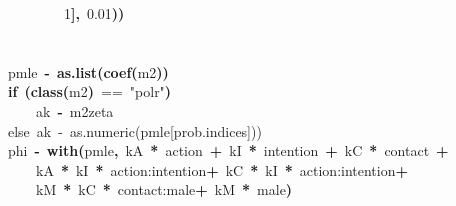 \documentclass{article}
\makeatletter
\newcommand{\hlnumber}[1]{\textcolor[rgb]{0,0,0}{#1}}%
\newcommand{\hlfunctioncall}[1]{\textcolor[rgb]{.5,0,.33}{\textbf{#1}}}%
\newcommand{\hlstring}[1]{\textcolor[rgb]{.6,.6,1}{#1}}%
\newcommand{\hlkeyword}[1]{\textbf{#1}}%
\newcommand{\hlcomment}[1]{\textcolor[rgb]{.18,.6,.34}{#1}}%
\newcommand{\hlassignement}[1]{\textbf{#1}}%
\newcommand{\hlsymbol}[1]{#1}%
\newcommand{\hlstd}[1]{\textcolor[rgb]{0,0,0}{#1}}%
\newenvironment{kframe}{%
 \def\FrameCommand##1{\hskip\@totalleftmargin \hskip-\fboxsep
 \colorbox{shadecolor}{##1}\hskip-\fboxsep
     \hskip-\linewidth \hskip-\@totalleftmargin \hskip\columnwidth}%
 \MakeFramed {\advance\hsize-\width
   \@totalleftmargin\z@ \linewidth\hsize
   \@setminipage}}%
 {\par\unskip\endMakeFramed}
\newenvironment{knitrout}{}{} %
\makeatother
\begin{document}
\begin{knitrout}
{\begin{kframe}
\begin{flushleft}
\hlstd{}{\ }{\ }{\ }{\ }{\ }{\ }{\ }{\ }{\ }{\ }{\ }{\ }\hlnumber{1}\hlkeyword{]}\hlkeyword{,}{\ }\hlnumber{0.01}\hlkeyword{)}\hlkeyword{)}\hspace*{\fill}\\
\hlstd{}{\ }{\ }{\ }{\ }\hlkeyword{\usebox{\hlnormalsizeboxclosebrace}}\hspace*{\fill}\\
\hlstd{}\hspace*{\fill}\\
\hlstd{}{\ }{\ }{\ }{\ }\hlsymbol{pmle}{\ }\hlassignement{\usebox{\hlnormalsizeboxlessthan}-}{\ }\hlfunctioncall{as.list}\hlkeyword{(}\hlfunctioncall{coef}\hlkeyword{(}\hlsymbol{m2}\hlkeyword{)}\hlkeyword{)}\hspace*{\fill}\\
\hlstd{}{\ }{\ }{\ }{\ }\hlkeyword{if}{\ }\hlkeyword{(}\hlfunctioncall{class}\hlkeyword{(}\hlsymbol{m2}\hlkeyword{)}{\ }=={\ }\hlstring{"{}polr"{}}\hlkeyword{)}\hspace*{\fill}\\
\hlstd{}{\ }{\ }{\ }{\ }{\ }{\ }{\ }{\ }\hlsymbol{ak}{\ }\hlassignement{\usebox{\hlnormalsizeboxlessthan}-}{\ }\hlsymbol{m2}\hlkeyword{\usebox{\hlnormalsizeboxdollar}}\hlsymbol{zeta}\hspace*{\fill}\\
\hlstd{}{\ }{\ }{\ }{\ }\hlcomment{\usebox{\hlnormalsizeboxhash}else{\ }ak{\ }\usebox{\hlnormalsizeboxlessthan}-{\ }as.numeric(pmle[prob.indices]))}\hspace*{\fill}\\
\hlstd{}{\ }{\ }{\ }{\ }\hlsymbol{phi}\hlsymbol{}{\ }\hlassignement{\usebox{\hlnormalsizeboxlessthan}-}{\ }\hlfunctioncall{with}\hlkeyword{(}\hlsymbol{pmle}\hlkeyword{,}{\ }\hlsymbol{kA}{\ }\hlkeyword{*}{\ }\hlsymbol{action}{\ }\hlkeyword{+}{\ }\hlsymbol{kI}{\ }\hlkeyword{*}{\ }\hlsymbol{intention}{\ }\hlkeyword{+}{\ }\hlsymbol{kC}{\ }\hlkeyword{*}{\ }\hlsymbol{contact}{\ }\hlkeyword{+}\hspace*{\fill}\\
\hlstd{}{\ }{\ }{\ }{\ }{\ }{\ }{\ }{\ }\hlsymbol{kA}{\ }\hlkeyword{*}{\ }\hlsymbol{kI}{\ }\hlkeyword{*}{\ }\hlsymbol{\usebox{\hlnormalsizeboxbacktick}action:intention\usebox{\hlnormalsizeboxbacktick}}{\ }\hlkeyword{+}{\ }\hlsymbol{kC}{\ }\hlkeyword{*}{\ }\hlsymbol{kI}{\ }\hlkeyword{*}{\ }\hlsymbol{\usebox{\hlnormalsizeboxbacktick}action:intention\usebox{\hlnormalsizeboxbacktick}}{\ }\hlkeyword{+}\hspace*{\fill}\\
\hlstd{}{\ }{\ }{\ }{\ }{\ }{\ }{\ }{\ }\hlsymbol{kM}{\ }\hlkeyword{*}{\ }\hlsymbol{kC}{\ }\hlkeyword{*}{\ }\hlsymbol{\usebox{\hlnormalsizeboxbacktick}contact:male\usebox{\hlnormalsizeboxbacktick}}{\ }\hlkeyword{+}{\ }\hlsymbol{kM}{\ }\hlkeyword{*}{\ }\hlsymbol{male}\hlkeyword{)}\hspace*{\fill}\\

\end{flushleft}
\end{kframe}}
\end{knitrout}
\end{document}
